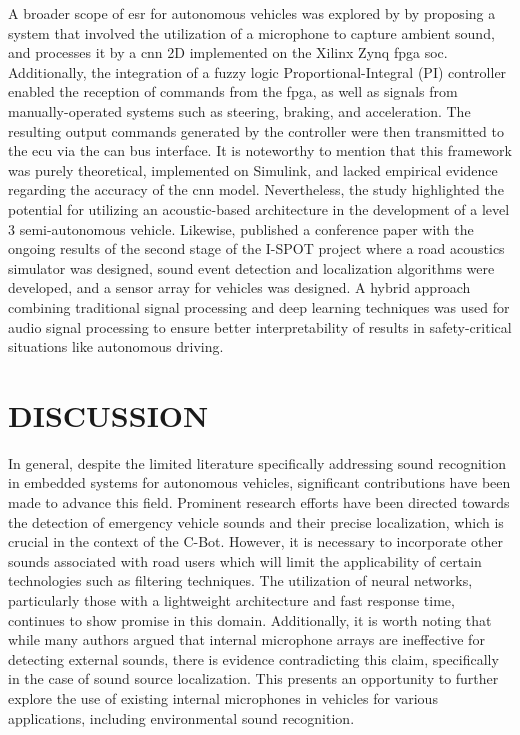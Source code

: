 A broader scope of \gls{esr} for autonomous vehicles was explored by \textcite{Veeraraghavan2020} by proposing a system that involved the utilization of a microphone to capture ambient sound, and processes it by a \gls{cnn} 2D implemented on the Xilinx Zynq \gls{fpga} \gls{soc}. Additionally, the integration of a fuzzy logic Proportional-Integral (PI) controller enabled the reception of commands from the \gls{fpga}, as well as signals from manually-operated systems such as steering, braking, and acceleration. The resulting output commands generated by the controller were then transmitted to the \gls{ecu} via the \gls{can} bus interface. It is noteworthy to mention that this framework was purely theoretical, implemented on Simulink, and lacked empirical evidence regarding the accuracy of the \gls{cnn} model. Nevertheless, the study highlighted the potential for utilizing an acoustic-based architecture in the development of a level 3 semi-autonomous vehicle. Likewise, \textcite{Yin2023} published a conference paper with the ongoing results of the second stage of the I-SPOT project \cite{ISPOT2020} where a road acoustics simulator was designed, sound event detection and localization algorithms were developed, and a sensor array for vehicles was designed. A hybrid approach combining traditional signal processing and deep learning techniques was used for audio signal processing to ensure better interpretability of results in safety-critical situations like autonomous driving. 


\section{DISCUSSION}
\label{sec:relt_wrk_discussion}

In general, despite the limited literature specifically addressing sound recognition in embedded systems for autonomous vehicles, significant contributions have been made to advance this field. Prominent research efforts have been directed towards the detection of emergency vehicle sounds and their precise localization, which is crucial in the context of the C-Bot. However, it is necessary to incorporate other sounds associated with road users which will limit the applicability of certain technologies such as filtering techniques. The utilization of neural networks, particularly those with a lightweight architecture and fast response time, continues to show promise in this domain. Additionally, it is worth noting that while many authors argued that internal microphone arrays are ineffective for detecting external sounds, there is evidence contradicting this claim, specifically in the case of sound source localization. This presents an opportunity to further explore the use of existing internal microphones in vehicles for various applications, including environmental sound recognition.



